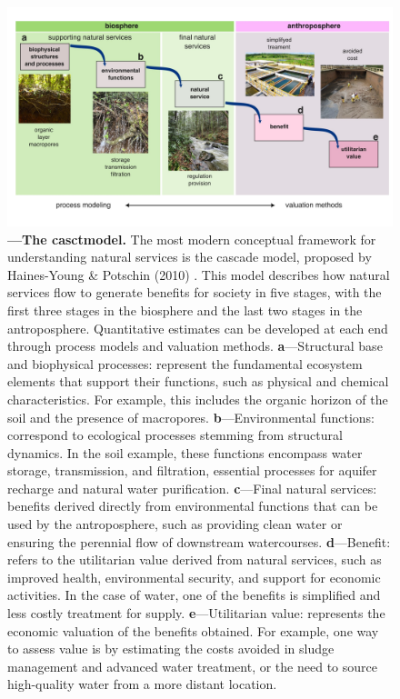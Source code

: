 \documentclass[./main_en.tex]{subfiles}
\begin{document}
\begin{figure}[t!] 
\centering				
\includegraphics[width=0.98\linewidth]{figs/fig_cascade_en.jpg}		
\caption[The Natural Services Cascade Model]
{\textbf{---\;The \gls{casctmodel}.}
    The most modern conceptual framework for understanding natural services is the cascade model, proposed by Haines-Young \& Potschin (2010) \cite{haines-young2010}. This model describes how natural services flow to generate benefits for society in five stages, with the first three stages in the biosphere and the last two stages in the antroposphere. Quantitative estimates can be developed at each end through process models and valuation methods.
    \;\textbf{a}\;---\;Structural base and biophysical processes: represent the fundamental ecosystem elements that support their functions, such as physical and chemical characteristics. For example, this includes the organic horizon of the soil and the presence of macropores.
    \;\textbf{b}\;---\;Environmental functions: correspond to ecological processes stemming from structural dynamics. In the soil example, these functions encompass water storage, transmission, and filtration, essential processes for aquifer recharge and natural water purification.
    \;\textbf{c}\;---\;Final natural services: benefits derived directly from environmental functions that can be used by the antroposphere, such as providing clean water or ensuring the perennial flow of downstream watercourses.
    \;\textbf{d}\;---\;Benefit: refers to the utilitarian value derived from natural services, such as improved health, environmental security, and support for economic activities. In the case of water, one of the benefits is simplified and less costly treatment for supply.
    \;\textbf{e}\;---\;Utilitarian value: represents the economic valuation of the benefits obtained. For example, one way to assess value is by estimating the costs avoided in sludge management and advanced water treatment, or the need to source high-quality water from a more distant location.
}
\label{fig:eco:cascade} 		
\end{figure}
\end{document}
